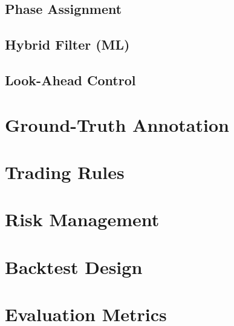 \subsection{Phase Assignment}
\subsection{Hybrid Filter (ML)}
\subsection{Look-Ahead Control}

\section{Ground-Truth Annotation}

\section{Trading Rules}

\section{Risk Management}

\section{Backtest Design}

\section{Evaluation Metrics}
